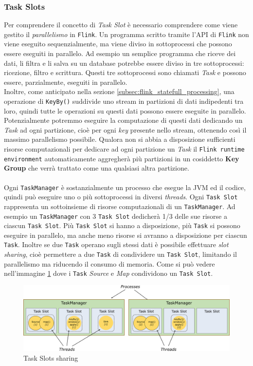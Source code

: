 \subsubsection{Task Slots}
\label{subsubsec:flink_Task_slots}
Per comprendere il concetto di \textit{Task Slot} è necessario comprendere come viene gestito il \textit{parallelismo} in \texttt{Flink}.    
Un programma scritto tramite l'API di \texttt{Flink} non viene eseguito sequenzialmente, ma viene diviso in sottoprocessi che possono essere eseguiti in parallelo.
Ad esempio un semplice programma che riceve dei dati, li filtra e li salva su un database potrebbe essere diviso in tre sottoprocessi: ricezione, filtro e scrittura.
Questi tre sottoprocessi sono chiamati \textit{Task} e possono essere, parzialmente, eseguiti in parallelo.\\
Inoltre, come anticipato nella sezione \ref{subsec:flink_statefull_processing}, una operazione di \texttt{KeyBy()} suddivide uno stream in partizioni di dati
indipedenti tra loro, quindi tutte le operazioni su questi dati possono essere eseguite in parallelo.
Potenzialmente potremmo eseguire la computazione di questi dati dedicando un \textit{Task} ad ogni partizione, cioè per ogni \textit{key} presente nello stream,
ottenendo così il massimo parallelismo possibile.
Qualora non si abbia a disposizione sufficienti risorse computazionali per dedicare ad ogni partizione un \textit{Task} il \texttt{Flink runtime environment} 
automaticamente aggregherà più partizioni in un cosiddetto \textbf{Key Group} che verrà trattato come una qualsiasi altra partizione.
\\\\
Ogni \texttt{TaskManager} è sostanzialmente un processo che esegue la JVM ed il codice, quindi può eseguire uno o più sottoprocessi in diversi \textit{threads}.
Ogni \texttt{Task Slot} rappresenta un sottoinsieme di risorse computazionali di un \texttt{TaskManager}.
Ad esempio un \texttt{TaskManager} con 3 \texttt{Task Slot} dedicherà 1/3 delle sue risorse a ciascun \texttt{Task Slot}.
Più \texttt{Task Slot} si hanno a disposizione, più \texttt{Task} si possono eseguire in parallelo, ma anche meno risorse si avranno a disposizione per ciascun \texttt{Task}.
Inoltre se due \texttt{Task} operano sugli stessi dati è possibile effettuare \textit{slot sharing}, cioè permettere a due \texttt{Task} di condividere un \texttt{Task Slot}, limitando il parallelismo ma riducendo il consumo di memoria.
Come si può vedere nell'immagine \ref{fig:flink_slots} dove i \texttt{Task} \textit{Source} e \textit{Map} condividono un \texttt{Task Slot}.
\begin{figure}[htbp]
    \centering
    \includegraphics[width=\textwidth]{images/flink/Tasks_slots.jpg}
    \caption{Task Slots sharing}
    \label{fig:flink_slots}
\end{figure}